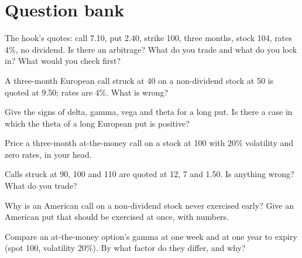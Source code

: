 \section{Question bank}

\begin{interviewq}\label{iq:iv:options-and-derivatives:1}
The hook's quotes: call 7.10, put 2.40, strike 100, three months, stock 104, rates 4\%, no dividend. Is there an arbitrage?
What do you trade and what do you lock in? What would you check first?
\end{interviewq}

\begin{interviewq}\label{iq:iv:options-and-derivatives:2}
A three-month European call struck at 40 on a non-dividend stock at 50 is quoted at 9.50; rates are 4\%. What is wrong?
\end{interviewq}

\begin{interviewq}\label{iq:iv:options-and-derivatives:3}
Give the signs of delta, gamma, vega and theta for a long put. Is there a case in which the theta of a long European put
is positive?
\end{interviewq}

\begin{interviewq}\label{iq:iv:options-and-derivatives:4}
Price a three-month at-the-money call on a stock at 100 with 20\% volatility and zero rates, in your head.
\end{interviewq}

\begin{interviewq}\label{iq:iv:options-and-derivatives:5}
Calls struck at 90, 100 and 110 are quoted at 12, 7 and 1.50. Is anything wrong? What do you trade?
\end{interviewq}

\begin{interviewq}\label{iq:iv:options-and-derivatives:6}
Why is an American call on a non-dividend stock never exercised early? Give an American put that should be exercised at
once, with numbers.
\end{interviewq}

\begin{interviewq}\label{iq:iv:options-and-derivatives:7}
Compare an at-the-money option's gamma at one week and at one year to expiry (spot 100, volatility 20\%). By
what factor do they differ, and why?
\end{interviewq}

